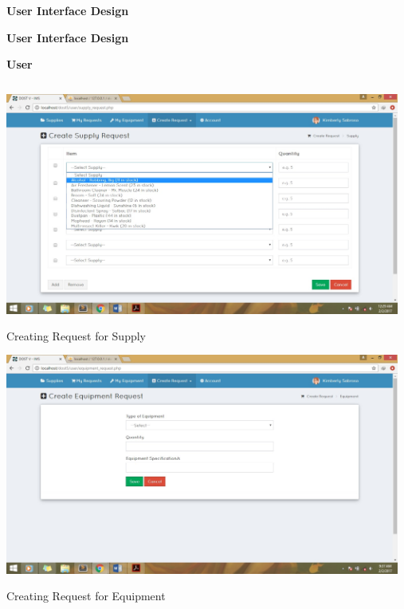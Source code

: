 \newpage
\begin{center} 
	\textbf{User Interface Design}
\end{center}
\begin{center}
	\textbf{User Interface Design \\}
	\vspace{5pt}
	
\begin{flushleft}
	\textbf{User}
\end{flushleft}

\begin{center}
	\includegraphics[width=13cm,height=8cm]{image/d3-1.jpg}\\
	Creating Request for Supply \\
	\vspace{1.5cm}
	\includegraphics[width=13cm,height=8cm]{image/d3-2.jpg}\\
	Creating Request for Equipment \\
	\vspace{1.5cm}

\end{center}
\end{center}
